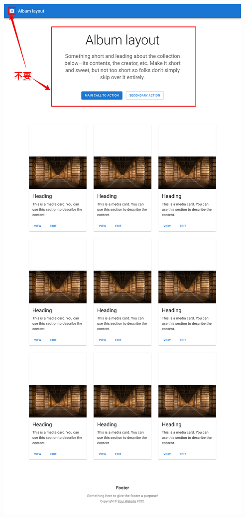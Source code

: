 \clearpage

\begin{reviewimage}%
\includegraphics[width=0.5\maxwidth]{./images/03-todo-with-react/mui005-albumLayout.png}%
\label{image:03-todo-with-react:mui005-albumLayout}
\end{reviewimage}

